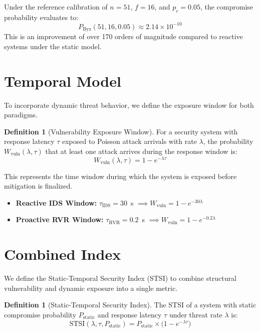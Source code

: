 \documentclass[12pt, oneside, a4paper]{report}
\theoremstyle{definition}
\newtheorem{definition}[theorem]{Definition}
\theoremstyle{remark}
\newcommand{\Pbyz}{P_{\mathrm{Byz}}}
\newcommand{\Wvuln}{W_{\mathrm{vuln}}}
\begin{document}
Under the reference calibration of $n=51$, $f=16$, and $p_c=0.05$, the compromise probability evaluates to:
\begin{equation}
\Pbyz(51, 16, 0.05) \approx 2.14 \times 10^{-10}
\end{equation}
This is an improvement of over 170 orders of magnitude compared to reactive systems under the static model.

\section{Temporal Model}
\label{sec:sm:temporal_model}

To incorporate dynamic threat behavior, we define the exposure window for both paradigms.

\begin{definition}[Vulnerability Exposure Window]
For a security system with response latency $\tau$ exposed to Poisson attack arrivals with rate $\lambda$, the probability $\Wvuln(\lambda, \tau)$ that at least one attack arrives during the response window is:
\begin{equation}
\Wvuln(\lambda, \tau) = 1 - e^{-\lambda \tau}
\end{equation}
\end{definition}

This represents the time window during which the system is exposed before mitigation is finalized.
\begin{itemize}
  \item \textbf{Reactive IDS Window:} $\tau_{\mathrm{IDS}} = 30$~s $\implies \Wvuln = 1 - e^{-30\lambda}$
  \item \textbf{Proactive RVR Window:} $\tau_{\mathrm{RVR}} = 0.2$~s $\implies \Wvuln = 1 - e^{-0.2\lambda}$
\end{itemize}

\section{Combined Index}
\label{sec:sm:combined_index}

We define the Static-Temporal Security Index (STSI) to combine structural vulnerability and dynamic exposure into a single metric.

\begin{definition}[Static-Temporal Security Index]
The STSI of a system with static compromise probability $P_{\mathrm{static}}$ and response latency $\tau$ under threat rate $\lambda$ is:
\begin{equation}
\mathrm{STSI}(\lambda, \tau, P_{\mathrm{static}}) = P_{\mathrm{static}} \times \bigl(1 - e^{-\lambda \tau}\bigr)
\end{equation}
\end{definition}
\end{document}
